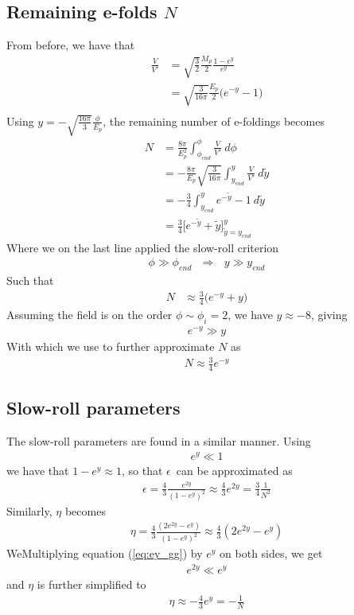 \documentclass[reprint,english,notitlepage]{revtex4-1}  %
\numberwithin{equation}{section}
\begin{document}
\subsection{Remaining e-folds $N$}
From before, we have that
\begin{align}
	\frac{V}{V'} &= \sqrt{\frac{3}{2}}\frac{M_p}{2} \frac{1-e^y}{e^y} \\
							 &= \sqrt{\frac{3}{16\pi}}\frac{E_p}{2} \bigg( e^{-y} -1 \bigg) \\
\end{align}
Using $y=-\sqrt{\frac{16\pi}{3}} \frac{\phi}{E_p}$, the remaining number of
e-foldings becomes
\begin{align}
	N &= \frac{8\pi}{E_p^2} \int_{\phi_{end}}^\phi \frac{V}{V'}\ d\phi \\
		&= -\frac{8\pi}{E_p} \sqrt{\frac{3}{16\pi}}\int_{y_{end}}^y \frac{V}{V'}\ d\tilde{y} \\
		&= -\frac{3}{4}\int_{y_{end}}^y e^{-\tilde{y}} -1\ d\tilde{y} \\
		&= \frac{3}{4}\bigg[ e^{-\tilde{y}} + \tilde{y}\bigg]_{\tilde{y}=y_{end}}^y
\end{align}
Where we on the last line applied the slow-roll criterion
\begin{align}
	\phi \gg \phi_{end} \ \ \ \Rightarrow \ \ \ y \gg y_{end}
\end{align}
Such that
\begin{align}
 N &\approx \frac{3}{4}\bigg( e^{-y} + y\bigg)
\end{align}
Assuming the field is on the order $\phi\sim\phi_i = 2$, we have $y \approx -8$,
giving
\begin{align}
	e^{-y} \gg y
\end{align}
With which we use to further approximate $N$ as
\begin{align}
	N \approx \frac{3}{4} e^{-y}
\end{align}

\subsection{Slow-roll parameters}
The slow-roll parameters are found in a similar manner. Using
\begin{align}
	e^y \ll 1	\label{eq:ey_gg}
\end{align}
we have that $1-e^y\approx 1$, so that $\epsilon$ can be approximated as
\begin{align}
	\epsilon = \frac{4}{3} \frac{e^{2y}}{(1-e^y)^2}
		 \approx \frac{4}{3} e^{2y}
		 = \frac{3}{4}\frac{1}{N^2}
\end{align}
Similarly, $\eta$ becomes
\begin{align}
	\eta = \frac{4}{3} \frac{(2e^{2y} - e^y)}{(1-e^y)^2}
		 \approx \frac{4}{3} (2e^{2y} - e^y)
\end{align}
WeMultiplying equation (\ref{eq:ey_gg}) by $e^y$ on both sides, we get
\begin{align}
	e^{2y} \ll e^y
\end{align}
and $\eta$ is further simplified to
\begin{align}
	\eta \approx -\frac{4}{3}e^y = -\frac{1}{N}
\end{align}
\end{document}
